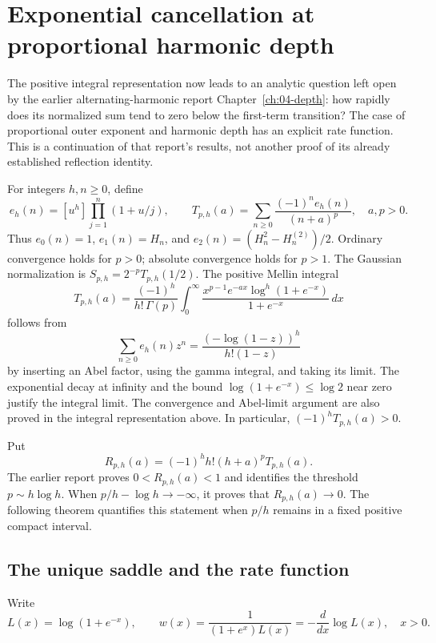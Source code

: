 \section{Exponential cancellation at proportional harmonic depth}
\label{saddle:sec:saddle}

The positive integral representation now leads to an
analytic question left open by the earlier alternating-harmonic report
Chapter~\ref{ch:04-depth}: how rapidly does its normalized sum tend to zero
below the first-term transition? The case of proportional outer exponent
and harmonic depth has an explicit rate function. This is a continuation
of that report's results, not another proof of its already established
reflection identity.

For integers $h,n\geq0$, define
\[
 e_h(n)=[u^h]\prod_{j=1}^n(1+u/j),\qquad
 T_{p,h}(a)=\sum_{n\geq0}\frac{(-1)^ne_h(n)}{(n+a)^p},
 \quad a,p>0.
\]
Thus $e_0(n)=1$, $e_1(n)=H_n$, and
$e_2(n)=(H_n^2-H_n^{(2)})/2$. Ordinary convergence holds for $p>0$;
absolute convergence holds for $p>1$. The Gaussian normalization is
$S_{p,h}=2^{-p}T_{p,h}(1/2)$. The positive Mellin integral
\begin{equation}\label{saddle:eq:positive-mellin}
 T_{p,h}(a)=\frac{(-1)^h}{h!\,\Gamma(p)}
 \int_0^\infty
 \frac{x^{p-1}e^{-ax}\log^h(1+e^{-x})}{1+e^{-x}}\,dx
\end{equation}
follows from
\[
 \sum_{n\geq0}e_h(n)z^n
 =\frac{(-\log(1-z))^h}{h!(1-z)}
\]
by inserting an Abel factor, using the gamma integral, and taking its
limit. The exponential decay at infinity and the bound
$\log(1+e^{-x})\leq\log2$ near zero justify the integral limit.
The convergence and Abel-limit argument are also proved in
the integral representation above. In particular,
$(-1)^hT_{p,h}(a)>0$.

Put
\begin{equation}\label{saddle:eq:R-definition}
 R_{p,h}(a)=(-1)^h h!(h+a)^p T_{p,h}(a).
\end{equation}
The earlier report proves $0<R_{p,h}(a)<1$ and identifies the threshold
$p\sim h\log h$. When $p/h-\log h\to-\infty$, it proves that
$R_{p,h}(a)\to0$. The following theorem quantifies this statement when
$p/h$ remains in a fixed positive compact interval.

\subsection{The unique saddle and the rate function}

Write
\begin{equation}\label{saddle:eq:L-w}
 L(x)=\log(1+e^{-x}),\qquad
 w(x)=\frac1{(1+e^x)L(x)}=-\frac{d}{dx}\log L(x),\quad x>0.
\end{equation}

